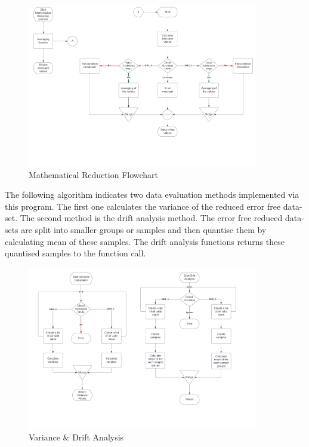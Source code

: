 \begin{figure}[H]
    \centering
    \includegraphics[width= 0.9\textwidth]{images/MathematicalProcess.png}
    \caption [Mathematical Reduction]{Mathematical Reduction Flowchart}  
    \label{fig:Mathematical Reduction}
\end{figure}


The following algorithm indicates two data evaluation methods implemented via this program. The first one calculates the variance of the reduced error free data-set. The second method is the drift analysis method. The error free reduced data-sets are split into smaller groups or samples and then quantise them by calculating mean of these samples. The drift analysis functions returns these quantised samples to the function call.

\begin{figure}[H]
    \centering
    \includegraphics[width= 0.9\textwidth]{images/Drift.png}
    \caption [Drift Analysis]{Variance \& Drift Analysis}  
    \label{fig:Drift Analysis}
\end{figure}


